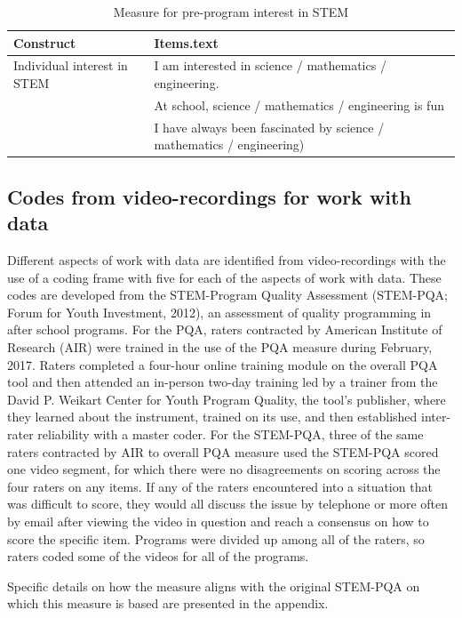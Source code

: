 \documentclass[]{msu-thesis}
\theoremstyle{definition}
\theoremstyle{definition}
\theoremstyle{definition}
\theoremstyle{remark}
\begin{document}
\begin{table}

\caption{\label{tab:unnamed-chunk-5}Measure for pre-program interest in STEM}
\centering
\begin{tabular}[t]{ll}
\toprule
Construct & Items.text\\
\midrule
Individual interest in STEM & I am interested in science / mathematics / engineering.\\
 & At school, science / mathematics / engineering is fun\\
 & I have always been fascinated by science / mathematics / engineering)\\
\bottomrule
\end{tabular}
\end{table}

\subsection{Codes from video-recordings for work with
data}\label{codes-from-video-recordings-for-work-with-data}

Different aspects of work with data are identified from video-recordings
with the use of a coding frame with five for each of the aspects of work
with data. These codes are developed from the STEM-Program Quality
Assessment (STEM-PQA; Forum for Youth Investment, 2012), an assessment
of quality programming in after school programs. For the PQA, raters
contracted by American Institute of Research (AIR) were trained in the
use of the PQA measure during February, 2017. Raters completed a
four-hour online training module on the overall PQA tool and then
attended an in-person two-day training led by a trainer from the David
P. Weikart Center for Youth Program Quality, the tool's publisher, where
they learned about the instrument, trained on its use, and then
established inter-rater reliability with a master coder. For the
STEM-PQA, three of the same raters contracted by AIR to overall PQA
measure used the STEM-PQA scored one video segment, for which there were
no disagreements on scoring across the four raters on any items. If any
of the raters encountered into a situation that was difficult to score,
they would all discuss the issue by telephone or more often by email
after viewing the video in question and reach a consensus on how to
score the specific item. Programs were divided up among all of the
raters, so raters coded some of the videos for all of the programs.

Specific details on how the measure aligns with the original STEM-PQA on
which this measure is based are presented in the appendix.
\end{document}
